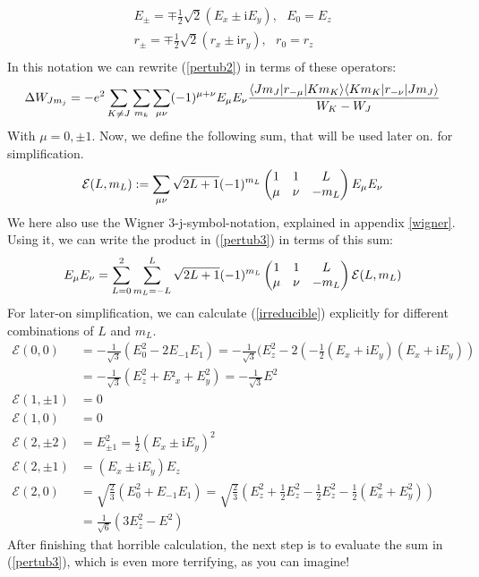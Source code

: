 \begin{align}
E_{\pm}=\mp\frac{1}{2}\sqrt{2}(E_x\pm \mathrm{i}E_y),\ \ \ E_0=E_z\\
r_{\pm}=\mp\frac{1}{2}\sqrt{2}(r_x\pm \mathrm{i}r_y),\ \ \ r_0=r_z\\
\end{align}
In this notation we can rewrite (\ref{pertub2}) in terms of these operators:
\begin{equation}
\Delta W_{Jm_j}=-e^2\sum_{K\neq J}\sum_{m_k}\sum_{\mu\nu}(-1)^{\mu+\nu}E_\mu E_\nu\frac{\langle Jm_J| r_{-\mu} | Km_K\rangle\langle Km_K| r_{-\nu} | Jm_J\rangle}{W_K-W_J}\label{pertub3}
\end{equation}
With $\mu=0,\pm1$. Now, we define the following sum, that will be used later on.  for simplification.
\begin{equation}
\mathcal{E}(L,m_L):=\sum_{\mu\nu}\sqrt{2L+1}(-1)^{m_L}\begin{pmatrix}1&1&L\\\mu&\nu&-m_L\end{pmatrix}E_\mu E_\nu\label{irreducible}
\end{equation}
We here also use the Wigner 3-j-symbol-notation, explained in appendix \ref{wigner}. Using it, we can write the product in (\ref{pertub3}) in terms of this sum: 
\begin{equation}
E_\mu E_\nu=\sum^2_{L=0}\sum^L_{m_L=-L}\sqrt{2L+1}(-1)^{m_L}\begin{pmatrix}1&1&L\\\mu&\nu&-m_L\end{pmatrix}\mathcal{E}(L,m_L)
\end{equation}
For later-on simplification, we can calculate (\ref{irreducible}) explicitly for different combinations of $L$ and $m_L$.
\begin{align*}
\mathcal{E}(0,0)&=-\frac{1}{\sqrt{3}}(E^2_0-2E_{-1}E_{1})=-\frac{1}{\sqrt{3}}(E^2_z-2(-\frac{1}{2}(E_x+\mathrm{i}E_y)(E_x+\mathrm{i}E_y))\\&=-\frac{1}{\sqrt{3}}(E^2_z+E²_x+E^2_y)=-\frac{1}{\sqrt{3}}E^2\\
\mathcal{E}(1,\pm 1)&=0\\
\mathcal{E}(1,0)&=0\\
\mathcal{E}(2,\pm2)&=E^2_{\pm1}=\frac{1}{2}(E_x\pm \mathrm{i}E_y)^2\\
\mathcal{E}(2,\pm1)&=(E_x\pm \mathrm{i}E_y)E_z\\
\mathcal{E}(2,0)&=\sqrt{\frac{2}{3}}(E^2_0+E_{-1}E_1)=\sqrt{\frac{2}{3}}(E^2_z+\frac{1}{2}E^2_z-\frac{1}{2}E^2_z-\frac{1}{2}(E^2_x+E^2_y))\\&=\frac{1}{\sqrt{6}}(3E^2_z-E^2)
\end{align*}
After finishing that horrible calculation, the next step is to evaluate the sum in (\ref{pertub3}), which is even more terrifying, as you can imagine!

